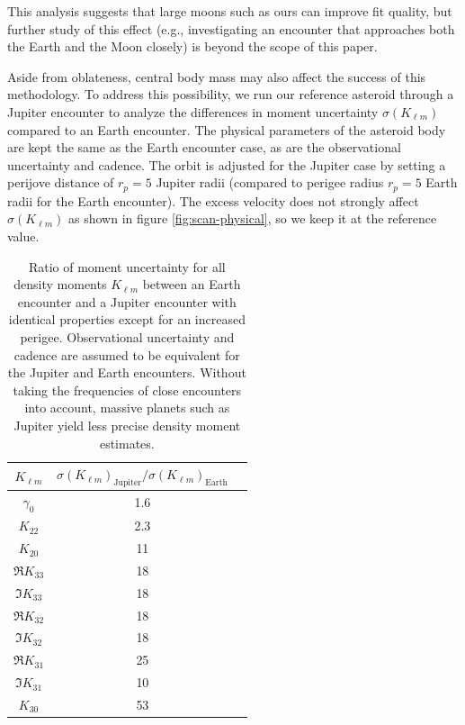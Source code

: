 \documentclass[fleqn,usenatbib]{mnras}
\begin{document}
This analysis suggests that large moons such as ours can improve fit quality, but further study of this effect (e.g., investigating an encounter that approaches both the Earth and the Moon closely) is beyond the scope of this paper.

Aside from oblateness, central body mass may also affect the success of this methodology. To address this possibility, we run our reference asteroid through a Jupiter encounter to analyze the differences in moment uncertainty $\sigma(K_{\ell m})$ compared to an Earth encounter. The physical parameters of the asteroid body are kept the same as the Earth encounter case, as are the observational uncertainty and cadence. The orbit is adjusted for the Jupiter case by setting a perijove distance of $r_p=5$ Jupiter radii (compared to perigee radius $r_p=5$ Earth radii for the Earth encounter). The excess velocity does not strongly affect $\sigma(K_{\ell m})$ as shown in figure \ref{fig:scan-physical}, so we keep it at the reference value.
\begin{table}
  \centering
  \begin{tabular}{c|cc}
    \hline 
    $K_{\ell m}$ & $\sigma(K_{\ell m})_\text{Jupiter}/\sigma(K_{\ell m})_\text{Earth}$\\ \hline 
    $\gamma_0$ & 1.6 \\
    $K_{22}$ & 2.3 \\
    $K_{20}$ & 11 \\
    $\Re K_{33}$ & 18 \\
    $\Im K_{33}$ & 18 \\
    $\Re K_{32}$ & 18 \\
    $\Im K_{32}$ & 18 \\
    $\Re K_{31}$ & 25 \\
    $\Im K_{31}$ & 10 \\
    $K_{30}$ & 53 \\ \hline
  \end{tabular}
  \caption{Ratio of moment uncertainty for all density moments $K_{\ell m}$ between an Earth encounter and a Jupiter encounter with identical properties except for an increased perigee. Observational uncertainty and cadence are assumed to be equivalent for the Jupiter and Earth encounters. Without taking the frequencies of close encounters into account, massive planets such as Jupiter yield less precise density moment estimates.}
  \label{tab:jupiter-uncertainty}
\end{table}
\end{document}
